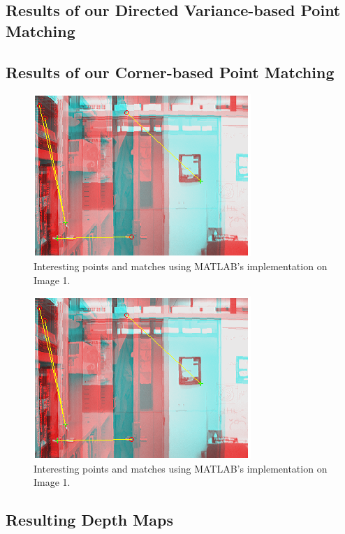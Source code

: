 \subsection{Results of our Directed Variance-based Point Matching}

\subsection{Results of our Corner-based Point Matching}
\begin{figure}[h!]\centering
	\includegraphics[width=0.9\linewidth]{Images/01_matlab_match.png}
	\caption{Interesting points and matches using MATLAB's implementation on Image 1.}
	\label{fig:grid-example}
\end{figure}

\begin{figure}[h!]\centering
	\includegraphics[width=0.9\linewidth]{Images/01_matlab_match.png}
	\caption{Interesting points and matches using MATLAB's implementation on Image 1.}
	\label{fig:grid-example}
\end{figure}


\subsection{Resulting Depth Maps}
